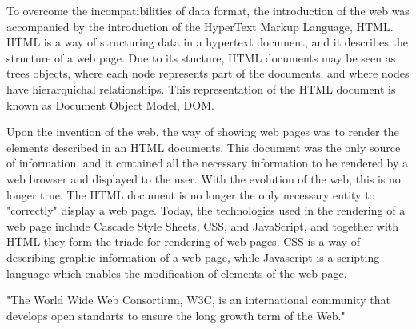 To overcome the incompatibilities of data format, the introduction of
the web was accompanied by the introduction of the HyperText Markup Language, HTML.
HTML is a way of structuring data in a hypertext document, and it describes
the structure of a web page. Due to its stucture, HTML documents may be seen as trees objects,
where each node represents part of the documents, and where nodes have hierarquichal relationships.
This representation of the HTML document is known as Document Object Model, DOM.

Upon the invention of the web, the way of showing web pages was to render the
elements described in an HTML documents. This document was the only source
of information, and it contained all the necessary information to be rendered by a web browser
and displayed to the user. With the evolution of the web, this is no longer true.
The HTML document is no longer the only necessary entity to "correctly" display a web page.
Today, the technologies used in the rendering of a web page include Cascade Style Sheets, CSS,
and JavaScript, and together with HTML they form the triade for rendering of web pages.
CSS is a way of describing graphic information of a web page, while Javascript is a scripting
language which enables the modification of elements of the web page.

"The World Wide Web Consortium, W3C, is an international community that develops
open standarts to ensure the long growth term of the Web."
